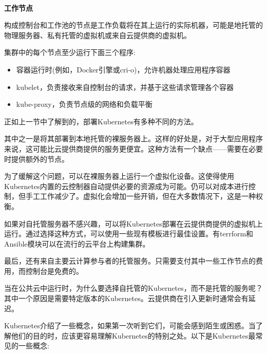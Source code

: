 \hspace*{\fill} \\ %
\noindent
\textbf{工作节点}

构成控制台和工作池的节点是工作负载将在其上运行的实际机器，可能是地托管的物理服务器、私有托管的虚拟机或来自云提供商的虚拟机。

集群中的每个节点至少运行下面三个程序:

\begin{itemize}
\item 
容器运行时(例如，Docker引擎或cri-o)，允许机器处理应用程序容器

\item 
kubelet，负责接收来自控制台的请求，并基于这些请求管理各个容器

\item 
kube-proxy，负责节点级的网络和负载平衡
\end{itemize}


正如上一节中了解到的，部署Kubernetes有多种不同的方法。

其中之一是将其部署到本地托管的裸服务器上。这样的好处是，对于大型应用程序来说，这可能比云提供商提供的服务更便宜。这种方法有一个缺点——需要在必要时提供额外的节点。

为了缓解这个问题，可以在裸服务器上运行一个虚拟化设备。这使得使用Kubernetes内置的云控制器自动提供必要的资源成为可能。仍可以对成本进行控制，但手工工作减少了。虚拟化会增加一些开销，但在大多数情况下，这是一种权衡。

如果对自托管服务器不感兴趣，可以将Kubernetes部署在云提供商提供的虚拟机上运行。通过选择这种方式，可以使用一些现有模板进行最佳设置。有terrform和Ansible模块可以在流行的云平台上构建集群。

最后，还有来自主要云计算参与者的托管服务。只需要支付其中一些工作节点的费用，而控制台是免费的。

当在公共云中运行时，为什么要选择自托管的Kubernetes，而不是托管的服务呢？其中一个原因是需要特定版本的Kubernetes。云提供商在引入更新时通常会有延迟。


Kubernetes介绍了一些概念，如果第一次听到它们，可能会感到陌生或困惑。当了解他们的目的时，应该更容易理解Kubernetes的特别之处。以下是Kubernetes最常见的一些概念:

